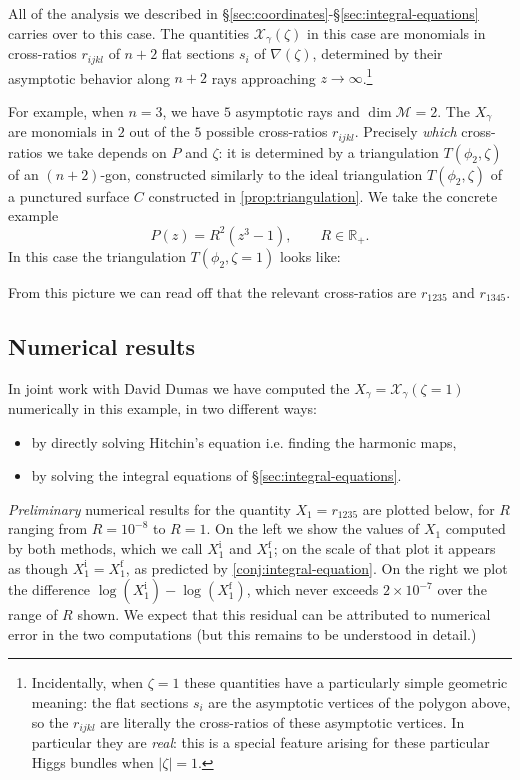 \documentclass[12pt,letterpaper,reqno]{article}
\numberwithin{equation}{section}
\newcommand{\cM}{\ensuremath{\mathcal M}}
\newcommand{\cX}{\ensuremath{\mathcal X}}
\newcommand{\R}{\ensuremath{\mathbb R}}
\newcommand{\abs}[1]{\lvert#1\rvert}
\newcommand{\ti}[1]{\textit{#1}}
\newcommand{\insfig}[2]{

\medskip
\noindent
\begin{minipage}{\linewidth}

\makebox[\linewidth]{\texttt{[image: figures/\#1-crop.pdf]}}

\end{minipage}
\medskip

}
\begin{document}
All of the analysis we described in
\S\ref{sec:coordinates}-\S\ref{sec:integral-equations}
carries over to this case.
The quantities $\cX_\gamma(\zeta)$ in this case are monomials in cross-ratios $r_{ijkl}$ of $n+2$ flat sections $s_i$
of $\nabla(\zeta)$,
determined by their asymptotic behavior along $n+2$ rays
approaching $z \to \infty$.\footnote{Incidentally, 
when $\zeta = 1$ these quantities have
a particularly simple geometric meaning: the flat sections
$s_i$ are the asymptotic vertices of the
polygon above, so the $r_{ijkl}$ are literally
the cross-ratios of these asymptotic vertices.
In particular they are \ti{real}: this is a special feature
arising for these particular Higgs bundles when 
$\abs{\zeta}=1$.}

For example, when $n=3$, we have $5$ asymptotic rays and $\dim \cM = 2$. The $X_\gamma$ are monomials in
$2$ out of the $5$ possible cross-ratios $r_{ijkl}$. 
Precisely \ti{which} cross-ratios we take depends on $P$ and $\zeta$:
it is determined by a triangulation $T(\phi_2, \zeta)$ 
of an $(n+2)$-gon, constructed similarly to the
ideal triangulation $T(\phi_2, \zeta)$ of a punctured surface 
$C$ constructed in \autoref{prop:triangulation}.
We take the concrete example
\begin{equation}
  P(z) = R^2 (z^3 - 1), \qquad R \in \R_+.
\end{equation}
In this case the triangulation $T(\phi_2, \zeta = 1)$ looks
like:
\insfig{higgs-metric-16}{0.8}
From this picture we can read off that the 
relevant cross-ratios are $r_{1235}$ and $r_{1345}$.

\subsection{Numerical results}

In joint work with David Dumas we 
have computed the $X_\gamma = \cX_\gamma(\zeta = 1)$ numerically
in this example, in two different ways: 
\begin{itemize}
\item by
directly solving Hitchin's equation i.e. finding
the harmonic maps,
\item
by solving the integral equations of \S\ref{sec:integral-equations}.
\end{itemize}
\ti{Preliminary} numerical results for
the quantity $X_1 = r_{1235}$ are plotted below, for $R$ ranging
from $R = 10^{-8}$ to $R = 1$. On the left we show 
the values of $X_1$ computed by both methods, which we call
 $X_1^{\mathrm i}$ and $X_1^{\mathrm f}$; on the scale of that
plot it appears as though $X_1^{\mathrm i} = X_1^{\mathrm f}$,
as predicted by \autoref{conj:integral-equation}.
On the right we plot the difference
$\log(X_1^{\mathrm i}) - \log(X_1^{\mathrm f})$, 
which never exceeds $2 \times 10^{-7}$ over the range of $R$ shown.
We expect that this residual can be attributed to 
numerical error in the two computations (but this remains to be 
understood in detail.)
\end{document}
